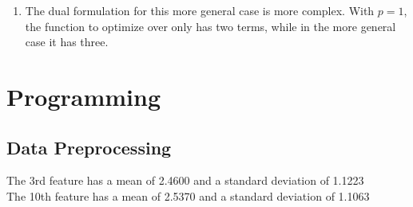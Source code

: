 \documentclass[12pt]{article}
\begin{document}
\begin{enumerate}[label=\alph*.]
	\item The dual formulation for this more general case is more complex. With $p = 1$, the function to optimize over only has two terms, while in the more general case it has three.
\end{enumerate}

\section{Programming}

\subsection{Data Preprocessing}
The 3rd feature has a mean of 2.4600 and a standard deviation of 1.1223 \\
The 10th feature has a mean of 2.5370 and a standard deviation of 1.1063 \\
\end{document}

